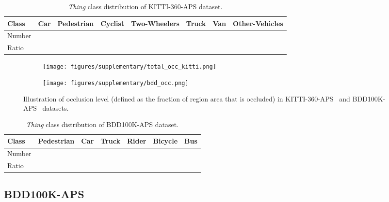 \documentclass[10pt,twocolumn,letterpaper]{article}
\begin{document}
\begin{table*}
\footnotesize 
\centering
\begin{tabular}{l|ccccccc}
\toprule
Class & Car & Pedestrian & Cyclist & Two-Wheelers & Truck & Van & Other-Vehicles \\
\midrule
 Number &  &  &   &  &  &  &   \\
 Ratio &  &  &   &  &  &  &  \\
\bottomrule
\end{tabular}
\caption{\textit{Thing} class distribution of KITTI-360-APS dataset.}
\label{tab:thingdist}
\end{table*}

\begin{figure}
    \centering
    \begin{subfigure}[b]{\linewidth}
        \centering
        \texttt{[image: figures/supplementary/total\_occ\_kitti.png]}
        \label{occ_kitti}
    \end{subfigure}
    \begin{subfigure}[b]{\linewidth}
        \centering 
        \texttt{[image: figures/supplementary/bdd\_occ.png]}
        \label{occ_bdd}
    \end{subfigure}
    \caption{Illustration of occlusion level (defined as the fraction of region area that is occluded) in KITTI-360-APS~ and BDD100K-APS~ datasets. }
    \label{fig:occ}
\end{figure}

\begin{table*}
\footnotesize 
\centering
\begin{tabular}{l|cccccc}
\toprule
Class & Pedestrian & Car & Truck & Rider & Bicycle & Bus \\
\midrule
 Number &  &  &   &  &  &   \\
 Ratio &  &  &   &  &  &   \\
\bottomrule
\end{tabular}
\caption{\textit{Thing} class distribution of BDD100K-APS dataset.}
\label{tab:thingdistbdd}
\end{table*}

\subsection{BDD100K-APS}
\end{document}
